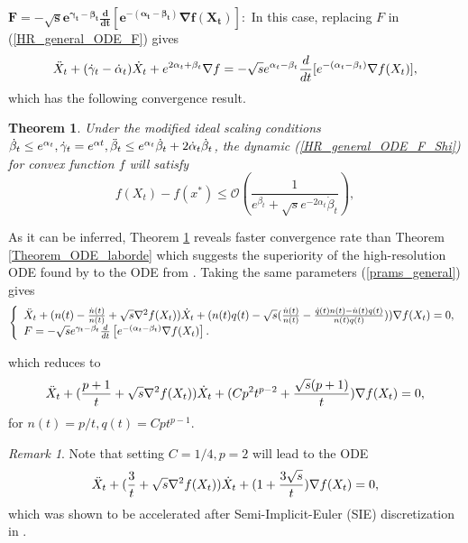\documentclass{article}
\theoremstyle{plain}
\newtheorem{theorem}{Theorem}[section]
\theoremstyle{definition}
\theoremstyle{remark}
\newtheorem{remark}{Remark}[theorem]
\begin{document}
     \( \boldsymbol{F = -\sqrt{s}e^{\gamma_t-\beta_t}\frac{d}{dt}\left[e^{-(\alpha_t-\beta_t)}\nabla f(X_t)\right]}:\)
    In this case, replacing $F$ in (\ref{HR_general_ODE_F}) gives
    \begin{align}\label{HR_general_ODE_F_Shi}
    \Ddot{X}_t + (\dot{\gamma}_t-\dot{\alpha}_t)\dot{X}_t+e^{2\alpha_t+\beta_t}\nabla f = -\sqrt{s}e^{\alpha_t-\beta_t}\frac{d}{dt}[e^{-(\alpha_t-\beta_t)}\nabla f(X_t)],
\end{align}
which has the following convergence result. \begin{theorem}\label{Theorem_ODE_Shi}
Under the modified ideal scaling conditions \(\dot\beta_t\leq e^{\alpha_t}, \dot\gamma_t=e^{\alpha t}, \Ddot{\beta}_t\leq e^{\alpha_t}\dot \beta_t + 2\dot \alpha_t \dot \beta_t\), the dynamic (\ref{HR_general_ODE_F_Shi}) for convex function \(f\) will satisfy 
\[f(X_t)-f(x^*)\leq \mathcal{O}(\frac{1}{e^{\beta_t}+\sqrt{s}e^{-2\alpha_t}\dot \beta_t}),\]
\end{theorem}

As it can be inferred, Theorem \ref{Theorem_ODE_Shi} reveals faster convergence rate than Theorem \ref{Theorem_ODE_laborde} which suggests the superiority of the high-resolution ODE found by \cite{Shi2021UnderstandingTA} to the ODE from \cite{pmlr-v108-laborde20a}. Taking the same parameters (\ref{prams_general}) gives
\begin{gather}
    \begin{aligned}\label{HR_cnts_general_npq_SHI}
\left\{
\begin{array}{l}
     \Ddot{X}_t + (n(t)-\frac{\dot n(t)}{n(t)}+\sqrt{s}\nabla^2 f(X_t))\dot{X}_t+(n(t)q(t)-\sqrt{s} (\frac{\dot n(t)}{n(t)}-\frac{\dot q(t)n(t)-\dot n(t)q(t)}{n(t)q(t)}))\nabla f(X_t)=0,   \\
     F = -\sqrt{s}e^{\gamma_t-\beta_t}\frac{d}{dt}\left[e^{-(\alpha_t-\beta_t)}\nabla f(X_t)\right]. 
\end{array}\right.\raisetag{12pt}
\end{aligned}
\end{gather}
 
which reduces to
\begin{align}\label{HR_cnts_general_npq_p}
     \Ddot{X}_t + (\frac{p+1}{t}+\sqrt{s}\nabla^2 f(X_t))\dot{X}_t+(Cp^2t^{p-2}+\frac{\sqrt{s}(p+1)}{t})\nabla f(X_t)=0,
\end{align}
for \(n(t)=p/t,q(t)=Cpt^{p-1}\). 
\begin{remark}
    Note that setting \(C=1/4,p=2\) will lead to the ODE 
\begin{align}\label{HR_cnts_general_stable_ODE}
     \Ddot{X}_t + (\frac{3}{t}+\sqrt{s}\nabla^2 f(X_t))\dot{X}_t+(1+\frac{3\sqrt{s}}{t})\nabla f(X_t)=0,
\end{align}
which was shown to be accelerated after Semi-Implicit-Euler (SIE) discretization in \cite{shi2019acceleration}.
\end{remark}
\end{document}
